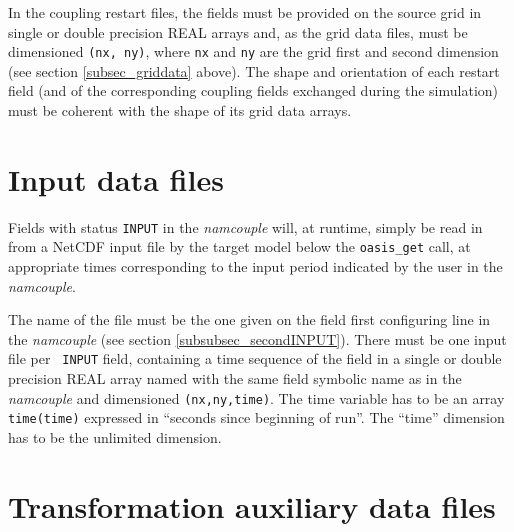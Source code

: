 In the coupling restart files, the fields must be provided on the
source grid in single or double precision REAL arrays and, as the grid
data files, must be dimensioned {\tt (nx, ny)}, where {\tt nx} and
{\tt ny} are the grid first and second dimension (see section
\ref{subsec_griddata} above).  The shape and orientation of each
restart field (and of the corresponding coupling fields exchanged
during the simulation) must be coherent with the shape of its grid
data arrays.

\section{Input data files}
\label{subsec_inputdata}

Fields with status {\tt INPUT} in the {\it namcouple} will, at
runtime, simply be read in from a NetCDF input file by the target
model below the {\tt oasis\_get} call, at appropriate times
corresponding to the input period indicated by the user in the {\it
  namcouple}.

The name of the file must be the one given on the field first
configuring line in the {\it namcouple} (see section
\ref{subsubsec_secondINPUT}). There must be one input file per {\tt
  INPUT} field, containing a time sequence of the field in a single or
double precision REAL array named with the same field symbolic name as in the
{\it namcouple} and dimensioned {\tt (nx,ny,time)}.  The time variable
has to be an array {\tt time(time)} expressed in ``seconds since
beginning of run''. The ``time'' dimension has to be the unlimited
dimension.


\section{Transformation auxiliary data files}
\label{subsec_mapdata}

